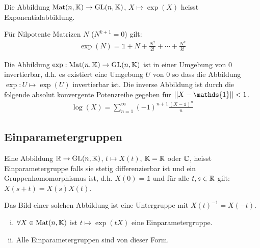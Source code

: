 \begin{definition}[Exponentialabbildung]
    Die Abbildung $\text{Mat}(n,\mathbb{K}) \rightarrow \text{GL}(n,\mathbb{K})$, $X \mapsto \exp(X)$
    heisst Exponentialabbildung.
\end{definition}

\begin{bemerkung}
    Für Nilpotente Matrizen $N$ ($N^{k+1} = 0$) gilt:
    \begin{align*}
        \exp(N) = \mathds{1} + N + \frac{N^2}{2!} + \dotsb + \frac{N^k}{k!}
    \end{align*}
\end{bemerkung}

\begin{lemma}
    Die Abbildung $\exp: \text{Mat}(n,\mathbb{K}) \rightarrow \text{GL}(n,\mathbb{K})$ ist in einer
    Umgebung von $0$ invertierbar, d.h. es existiert eine Umgebung $U$ von
    $0$ so dass die Abbildung $\exp: U \mapsto \exp(U)$ invertierbar ist. Die
    inverse Abbildung ist durch die folgende absolut konvergente Potenzreihe
    gegeben für $\Norm{X - \mathds{1}} < 1$.
    \begin{align*}
        \log(X) = \sum_{n=1}^\infty (-1)^{n+1} \frac{(X - \mathds{1})^n}{n}
    \end{align*}
\end{lemma}

\subsection{Einparametergruppen}

\begin{definition}[Einparametergruppe]
    Eine Abbildung $\mathbb{R} \rightarrow \text{GL}(n,\mathbb{K})$, $t \mapsto X(t)$, $\mathbb{K} = \mathbb{R}$ oder
    $\mathbb{C}$, heisst Einparametergruppe falls sie stetig differenzierbar ist und
    ein Gruppenhomomorphismus ist, d.h. $X(0) = \mathds{1}$ und für alle
    $t,s \in \mathbb{R}$ gilt: $X(s+t) = X(s) X(t)$.
\end{definition}

\begin{bemerkung}
    Das Bild einer solchen Abbildung ist eine Untergruppe mit $X(t)^{-1} = X(-t)$.
\end{bemerkung}

\begin{satz}
    \begin{enumerate}[(i)]
        \item $\forall X \in \text{Mat}(n,\mathbb{K})$ ist $t \mapsto \exp(t X)$ eine
            Einparametergruppe.
        \item Alle Einparametergruppen sind von dieser Form.
    \end{enumerate}
\end{satz}

